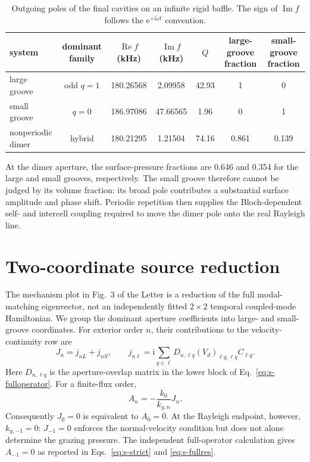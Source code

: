 \documentclass[aps,prl,reprint,superscriptaddress,nofootinbib,floatfix]{revtex4-2}
\newcommand{\ii}{\mathrm{i}}
\newcommand{\e}{\mathrm{e}}
\begin{document}
\begin{table}[t]
\caption{\label{tab:cavitymodes}Outgoing poles of the final cavities on an
infinite rigid baffle.  The sign of $\operatorname{Im}f$ follows the
$\e^{+\ii\omega t}$ convention.}
\begin{ruledtabular}
\begin{tabular}{lcccccc}
system & dominant family & $\operatorname{Re}f$ (kHz) &
$\operatorname{Im}f$ (kHz) & $Q$ & large-groove fraction & small-groove fraction\\
\hline
large groove & odd $q=1$ & 180.26568 & 2.09958 & 42.93 & 1 & 0\\
small groove & $q=0$ & 186.97086 & 47.66565 & 1.96 & 0 & 1\\
nonperiodic dimer & hybrid & 180.21295 & 1.21504 & 74.16 & 0.861 & 0.139\\
\end{tabular}
\end{ruledtabular}
\end{table}

At the dimer aperture, the surface-pressure fractions are 0.646 and 0.354 for
the large and small grooves, respectively.  The small groove therefore cannot
be judged by its volume fraction: its broad pole contributes a substantial
surface amplitude and phase shift.  Periodic repetition then supplies the
Bloch-dependent self- and intercell coupling required to move the dimer pole
onto the real Rayleigh line.

\section{Two-coordinate source reduction}

The mechanism plot in Fig.~3 of the Letter is a reduction of the full
modal-matching eigenvector, not an independently fitted $2\times2$ temporal
coupled-mode Hamiltonian.  We group the dominant aperture coefficients into
large- and small-groove coordinates.  For exterior order $n$, their
contributions to the velocity-continuity row are
\begin{equation}
 J_n=j_{nL}+j_{nS},\qquad
 j_{n\ell}=\ii\sum_{q\in\ell}D_{n,\ell q}
 (V_d)_{\ell q,\ell q}C_{\ell q}.
 \label{eq:s-source}
\end{equation}
Here $D_{n,\ell q}$ is the aperture-overlap matrix in the lower block of
Eq.~\eqref{eq:s-fulloperator}.  For a finite-flux order,
\begin{equation}
 A_n=-\frac{k_0}{k_{y,n}}J_n.
 \label{eq:s-source-to-pressure}
\end{equation}
Consequently $J_0=0$ is equivalent to $A_0=0$.  At the Rayleigh endpoint,
however, $k_{y,-1}=0$: $J_{-1}=0$ enforces the normal-velocity condition but
does not alone determine the grazing pressure.  The independent full-operator
calculation gives $A_{-1}=0$ as reported in
Eqs.~\eqref{eq:s-strict} and \eqref{eq:s-fullres}.
\end{document}

